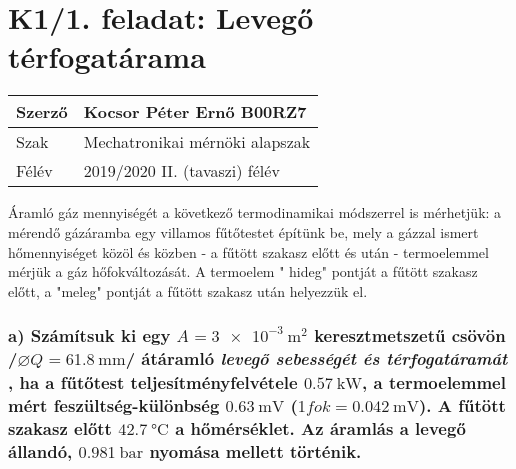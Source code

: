 \section*{K1/1. feladat: Levegő térfogatárama}



\begin{tabular}{ | p{2cm} | p{14cm} | } 
	\hline
	Szerző & Kocsor Péter Ernő B00RZ7 \\ 
	\hline
	Szak & Mechatronikai mérnöki alapszak \\ 
	\hline
	Félév & 2019/2020 II. (tavaszi) félév \\ 
	\hline
\end{tabular}
\vspace{0.5cm}

\noindent Áramló gáz mennyiségét a következő termodinamikai módszerrel is mérhetjük: a mérendő gázáramba egy villamos fűtőtestet építünk be, mely a gázzal ismert hőmennyiséget közöl és közben - a fűtött szakasz előtt és után - termoelemmel mérjük a gáz hőfokváltozását. A termoelem " hideg" pontját a fűtött szakasz előtt, a "meleg" pontját a fűtött szakasz után helyezzük el.

\subsubsection*{a) Számítsuk ki egy $A_{} = \SI{3e-3}{\meter\squared}$  keresztmetszetű csövön /$ \diameter Q_{}= \SI{61,8}{\milli\meter}$/ átáramló \textit{levegő sebességét és térfogatáramát} , ha a fűtőtest teljesítményfelvétele $\SI{0,57}{\kilo\watt}$, a termoelemmel mért feszültség-különbség $\SI{0,63}{\milli\volt}$ ($1 fok=\SI{0,042}{\milli\volt}$). A fűtött szakasz előtt $\SI{42,7}{\celsius} $ a hőmérséklet. Az áramlás a levegő állandó, $\SI{0.981}{\bar}$ nyomása mellett történik.}


